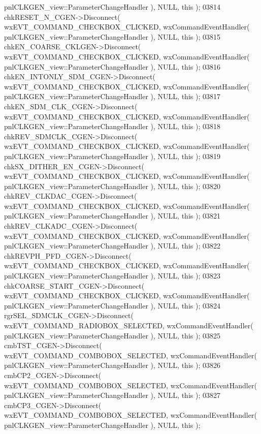 \begin{DoxyCode}
      pnlCLKGEN_view::ParameterChangeHandler ), NULL, \textcolor{keyword}{this} );
03814     chkRESET_N_CGEN->Disconnect( wxEVT\_COMMAND\_CHECKBOX\_CLICKED, wxCommandEventHandler( 
      pnlCLKGEN_view::ParameterChangeHandler ), NULL, \textcolor{keyword}{this} );
03815     chkEN_COARSE_CKLGEN->Disconnect( wxEVT\_COMMAND\_CHECKBOX\_CLICKED, wxCommandEventHandler( 
      pnlCLKGEN_view::ParameterChangeHandler ), NULL, \textcolor{keyword}{this} );
03816     chkEN_INTONLY_SDM_CGEN->Disconnect( wxEVT\_COMMAND\_CHECKBOX\_CLICKED, wxCommandEventHandler( 
      pnlCLKGEN_view::ParameterChangeHandler ), NULL, \textcolor{keyword}{this} );
03817     chkEN_SDM_CLK_CGEN->Disconnect( wxEVT\_COMMAND\_CHECKBOX\_CLICKED, wxCommandEventHandler( 
      pnlCLKGEN_view::ParameterChangeHandler ), NULL, \textcolor{keyword}{this} );
03818     chkREV_SDMCLK_CGEN->Disconnect( wxEVT\_COMMAND\_CHECKBOX\_CLICKED, wxCommandEventHandler( 
      pnlCLKGEN_view::ParameterChangeHandler ), NULL, \textcolor{keyword}{this} );
03819     chkSX_DITHER_EN_CGEN->Disconnect( wxEVT\_COMMAND\_CHECKBOX\_CLICKED, wxCommandEventHandler( 
      pnlCLKGEN_view::ParameterChangeHandler ), NULL, \textcolor{keyword}{this} );
03820     chkREV_CLKDAC_CGEN->Disconnect( wxEVT\_COMMAND\_CHECKBOX\_CLICKED, wxCommandEventHandler( 
      pnlCLKGEN_view::ParameterChangeHandler ), NULL, \textcolor{keyword}{this} );
03821     chkREV_CLKADC_CGEN->Disconnect( wxEVT\_COMMAND\_CHECKBOX\_CLICKED, wxCommandEventHandler( 
      pnlCLKGEN_view::ParameterChangeHandler ), NULL, \textcolor{keyword}{this} );
03822     chkREVPH_PFD_CGEN->Disconnect( wxEVT\_COMMAND\_CHECKBOX\_CLICKED, wxCommandEventHandler( 
      pnlCLKGEN_view::ParameterChangeHandler ), NULL, \textcolor{keyword}{this} );
03823     chkCOARSE_START_CGEN->Disconnect( wxEVT\_COMMAND\_CHECKBOX\_CLICKED, wxCommandEventHandler( 
      pnlCLKGEN_view::ParameterChangeHandler ), NULL, \textcolor{keyword}{this} );
03824     rgrSEL_SDMCLK_CGEN->Disconnect( wxEVT\_COMMAND\_RADIOBOX\_SELECTED, wxCommandEventHandler( 
      pnlCLKGEN_view::ParameterChangeHandler ), NULL, \textcolor{keyword}{this} );
03825     cmbTST_CGEN->Disconnect( wxEVT\_COMMAND\_COMBOBOX\_SELECTED, wxCommandEventHandler( 
      pnlCLKGEN_view::ParameterChangeHandler ), NULL, \textcolor{keyword}{this} );
03826     cmbCP2_CGEN->Disconnect( wxEVT\_COMMAND\_COMBOBOX\_SELECTED, wxCommandEventHandler( 
      pnlCLKGEN_view::ParameterChangeHandler ), NULL, \textcolor{keyword}{this} );
03827     cmbCP3_CGEN->Disconnect( wxEVT\_COMMAND\_COMBOBOX\_SELECTED, wxCommandEventHandler( 
      pnlCLKGEN_view::ParameterChangeHandler ), NULL, \textcolor{keyword}{this} );

\end{DoxyCode}
